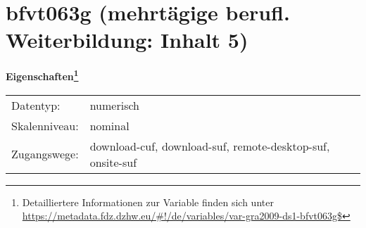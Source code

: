 
    \setcounter{footnote}{0}

    \vspace*{-1.8cm}
	\section{bfvt063g (mehrtägige berufl. Weiterbildung: Inhalt 5)}
	\label{section:bfvt063g}



    \vspace*{0.5cm}
    \noindent\textbf{Eigenschaften\footnote{Detailliertere Informationen zur Variable finden sich unter
		\url{https://metadata.fdz.dzhw.eu/\#!/de/variables/var-gra2009-ds1-bfvt063g$}}}\\
	\begin{tabularx}{\hsize}{@{}lX}
	Datentyp: & numerisch \\
	Skalenniveau: & nominal \\
	Zugangswege: &
	  download-cuf, 
	  download-suf, 
	  remote-desktop-suf, 
	  onsite-suf
 \\
    \end{tabularx}




